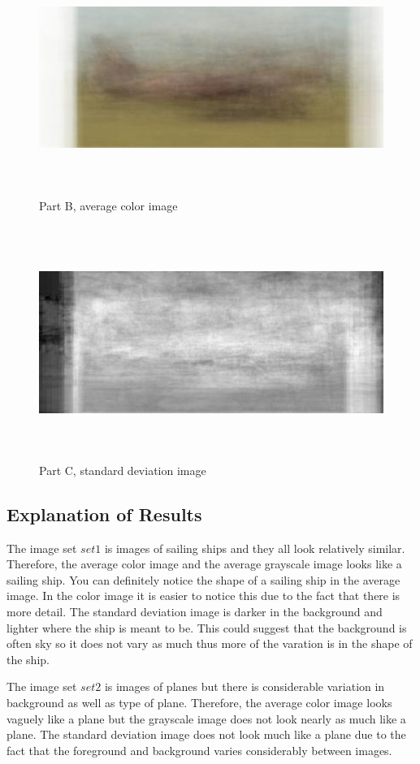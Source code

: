 \documentclass[11pt,psfig]{article}
\begin{document}
\begin{figure}[H]
\centering
\includegraphics[height=3in]{set2color.jpg}
\caption{Part B, average color image}
\end{figure}

\begin{figure}[H]
\centering
\includegraphics[height=3in]{set2grayscaleStndDev.jpg}
\caption{Part C, standard deviation image}
\end{figure}

\subsection*{Explanation of Results}

The image set $set1$ is images of sailing ships and they all look relatively similar. Therefore, the average color image and the average grayscale image looks like a sailing ship. You can definitely notice the shape of a sailing ship in the average image. In the color image it is easier to notice this due to the fact that there is more detail. The standard deviation image is darker in the background and lighter where the ship is meant to be. This could suggest that the background is often sky so it does not vary as much thus more of the varation is in the shape of the ship. 

The image set $set2$ is images of planes but there is considerable variation in background as well as type of plane. Therefore, the average color image looks vaguely like a plane but the grayscale image does not look nearly as much like a plane. The standard deviation image does not look much like a plane due to the fact that the foreground and background varies considerably between images. 
\end{document}
